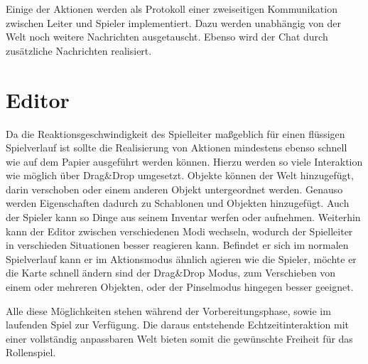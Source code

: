 Einige der Aktionen werden als Protokoll einer zweiseitigen Kommunikation zwischen Leiter und Spieler implementiert. Dazu werden unabhängig von der Welt noch weitere Nachrichten ausgetauscht. Ebenso wird der Chat durch zusätzliche Nachrichten realisiert.

\section{Editor}
\label{sec:Editor}
Da die Reaktionsgeschwindigkeit des Spielleiter maßgeblich für einen flüssigen Spielverlauf ist sollte die Realisierung von Aktionen mindestens ebenso schnell wie auf dem Papier ausgeführt werden können.\newline
Hierzu werden so viele Interaktion wie möglich über Drag\&Drop umgesetzt. Objekte können der Welt hinzugefügt, darin verschoben oder einem anderen Objekt untergeordnet werden. Genauso werden Eigenschaften dadurch zu Schablonen und Objekten hinzugefügt. Auch der Spieler kann so Dinge aus seinem Inventar werfen oder aufnehmen.\newline
Weiterhin kann der Editor zwischen verschiedenen Modi wechseln, wodurch der Spielleiter in verschieden Situationen besser reagieren kann. Befindet er sich im normalen Spielverlauf kann er im Aktionsmodus ähnlich agieren wie die Spieler, möchte er die Karte schnell ändern sind der Drag\&Drop Modus, zum Verschieben von einem oder mehreren Objekten, oder der Pinselmodus hingegen besser geeignet.

Alle diese Möglichkeiten stehen während der Vorbereitungsphase, sowie im laufenden Spiel zur Verfügung. Die daraus entstehende Echtzeitinteraktion mit einer vollständig anpassbaren Welt bieten somit die gewünschte Freiheit für das Rollenspiel.